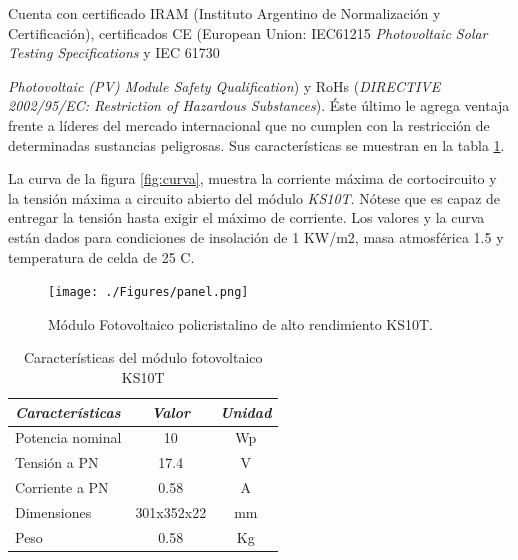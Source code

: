 Cuenta con certificado IRAM (Instituto Argentino de Normalización y Certificación), certificados CE (European Union: IEC61215 \textit{Photovoltaic Solar Testing Specifications} y IEC 61730 {\textit{Photovoltaic (PV) Module Safety Qualification}) y RoHs (\textit{DIRECTIVE 2002/95/EC: Restriction of Hazardous Substances}). Éste último le agrega ventaja frente a líderes del mercado internacional que no cumplen con la restricción de determinadas sustancias peligrosas. Sus características se muestran en la tabla \ref{tab:ks10t}. 

La curva de la figura \ref{fig:curva}, muestra la corriente máxima de cortocircuito y la tensión máxima a circuito abierto del módulo \textit{KS10T}. Nótese que es capaz de entregar la tensión hasta exigir el máximo de corriente. Los valores y la curva están dados para condiciones de insolación de 1 KW/m2, masa atmosférica 1.5 y temperatura de celda de 25 \grados C\citep{solar}.

 \begin{figure}[h!]
	\centering
    \texttt{[image: ./Figures/panel.png]}
    	\caption{Módulo Fotovoltaico policristalino de alto rendimiento KS10T.}
	\label{fig:ks10t}
\end{figure}

\vspace{10px}

\begin{table}[ht]
	\centering
	\caption{Características del módulo fotovoltaico KS10T}
	\begin{tabular}{@{} l *2c @{}}    \toprule
		\emph{\textbf{Características}} & \emph{\textbf{Valor}} & \emph{\textbf{Unidad}}\\
		\midrule
		Potencia nominal	& 10 	& Wp	\\	
		Tensión a PN		& 17.4	& V\\
		Corriente a PN	& 0.58		& A\\
		Dimensiones		& 301x352x22 	& mm\\
		Peso				& 0.58		& Kg	\\
		\bottomrule
		\hline
	\end{tabular}
	\label{tab:ks10t}
\end{table}



}
